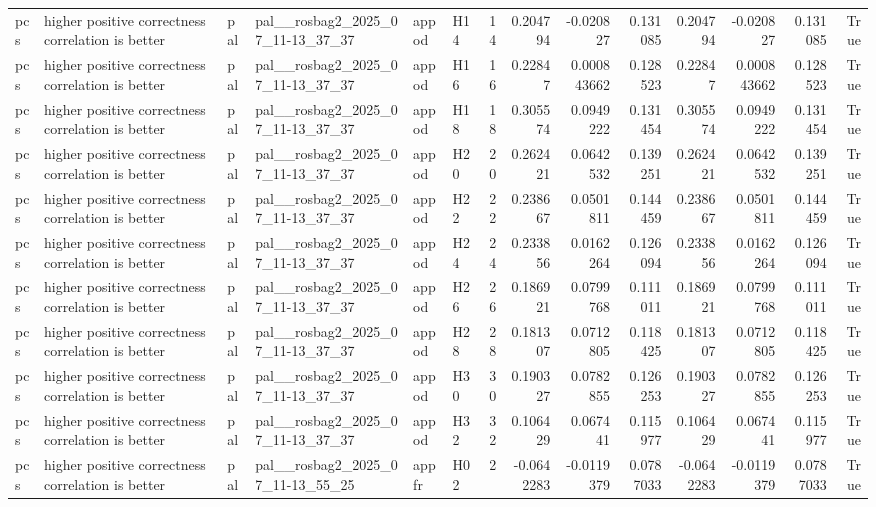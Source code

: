 \begin{longtable}{llllllrrrrrrrr}
pcs & higher positive correctness correlation is better & pal & pal\_\_rosbag2\_2025\_07\_11-13\_37\_37 & appod & H14 & 14 & 0.204794 & -0.020827 & 0.131085 & 0.204794 & -0.020827 & 0.131085 & True \\
pcs & higher positive correctness correlation is better & pal & pal\_\_rosbag2\_2025\_07\_11-13\_37\_37 & appod & H16 & 16 & 0.22847 & 0.000843662 & 0.128523 & 0.22847 & 0.000843662 & 0.128523 & True \\
pcs & higher positive correctness correlation is better & pal & pal\_\_rosbag2\_2025\_07\_11-13\_37\_37 & appod & H18 & 18 & 0.305574 & 0.0949222 & 0.131454 & 0.305574 & 0.0949222 & 0.131454 & True \\
pcs & higher positive correctness correlation is better & pal & pal\_\_rosbag2\_2025\_07\_11-13\_37\_37 & appod & H20 & 20 & 0.262421 & 0.0642532 & 0.139251 & 0.262421 & 0.0642532 & 0.139251 & True \\
pcs & higher positive correctness correlation is better & pal & pal\_\_rosbag2\_2025\_07\_11-13\_37\_37 & appod & H22 & 22 & 0.238667 & 0.0501811 & 0.144459 & 0.238667 & 0.0501811 & 0.144459 & True \\
pcs & higher positive correctness correlation is better & pal & pal\_\_rosbag2\_2025\_07\_11-13\_37\_37 & appod & H24 & 24 & 0.233856 & 0.0162264 & 0.126094 & 0.233856 & 0.0162264 & 0.126094 & True \\
pcs & higher positive correctness correlation is better & pal & pal\_\_rosbag2\_2025\_07\_11-13\_37\_37 & appod & H26 & 26 & 0.186921 & 0.0799768 & 0.111011 & 0.186921 & 0.0799768 & 0.111011 & True \\
pcs & higher positive correctness correlation is better & pal & pal\_\_rosbag2\_2025\_07\_11-13\_37\_37 & appod & H28 & 28 & 0.181307 & 0.0712805 & 0.118425 & 0.181307 & 0.0712805 & 0.118425 & True \\
pcs & higher positive correctness correlation is better & pal & pal\_\_rosbag2\_2025\_07\_11-13\_37\_37 & appod & H30 & 30 & 0.190327 & 0.0782855 & 0.126253 & 0.190327 & 0.0782855 & 0.126253 & True \\
pcs & higher positive correctness correlation is better & pal & pal\_\_rosbag2\_2025\_07\_11-13\_37\_37 & appod & H32 & 32 & 0.106429 & 0.067441 & 0.115977 & 0.106429 & 0.067441 & 0.115977 & True \\
pcs & higher positive correctness correlation is better & pal & pal\_\_rosbag2\_2025\_07\_11-13\_55\_25 & appfr & H02 & 2 & -0.0642283 & -0.0119379 & 0.0787033 & -0.0642283 & -0.0119379 & 0.0787033 & True \\

\end{longtable}
